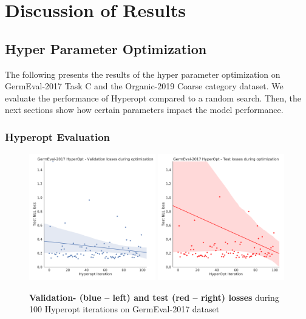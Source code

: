 \chapter{Discussion of Results}
\label{ch:discussion}

\section{Hyper Parameter Optimization}

The following presents the results of the hyper parameter optimization on GermEval-2017 Task C and the Organic-2019 Coarse category dataset. We evaluate the performance of Hyperopt compared to a random search. Then, the next sections show how certain parameters impact the model performance. 

\subsection{Hyperopt Evaluation}

\begin{figure}[ht]
	\centering
	\includegraphics[width=0.49\textwidth]{figures/06_results/06_hp_ge_lm_loss-iteration_validation}
	\includegraphics[width=0.49\textwidth]{figures/06_results/06_hp_ge_lm_loss-iteration_test}
	\caption{\textbf{Validation- {(blue -- left)} and test {(red -- right)} losses} during 100 Hyperopt iterations on GermEval-2017 dataset}
	\label{fig:06_ValidationLossGermEvalHp}
\end{figure}

